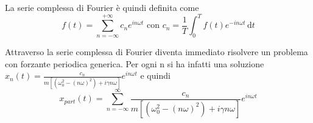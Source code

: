 \begin{definition}
	La serie complessa di Fourier è quindi definita come 
	\[
		f(t) = \sum_{n=-\infty}^{+\infty} c_n e^{in \omega t} \text{ con } c_n = \frac{1}{T} \int_{0}^{T} f(t) e^{-in \omega t} \,\mathrm{d}t 
	\]
\end{definition}
Attraverso la serie complessa di Fourier diventa immediato risolvere un problema con forzante periodica generica. Per ogni n si ha infatti una soluzione \(x_n(t)=\frac{c_n}{m [(\omega _0 ^{2} - (n \omega )^{2} )+i \gamma n \omega ]}e^{in \omega t} \) e quindi
\[
	x_{part}(t)=\sum_{n=-\infty }^{\infty} \frac{c_n}{m [(\omega _0 ^{2} - (n \omega )^{2} )+i \gamma n \omega ]}e^{in \omega t}
\]
